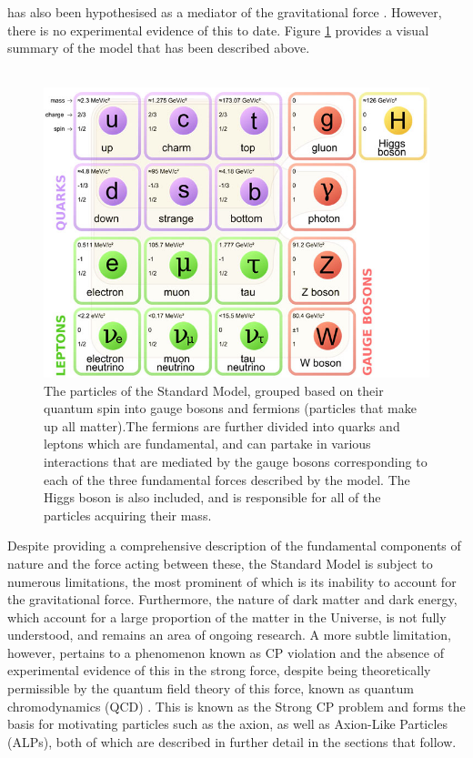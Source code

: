 has also been hypothesised as a mediator of the gravitational force \cite{Holstein:2006bh}. However, there is no experimental evidence of this to date. Figure \ref{StandardModel} provides a visual summary of the model that has been described above.\\
\\
\begin{figure}[H]
    \centering
    \includegraphics[scale = 0.4]{StandardModel.jpg}
    \caption{The particles of the Standard Model, grouped based on their quantum spin into gauge bosons and fermions (particles that make up all matter).The fermions are further divided into quarks and leptons which are fundamental, and can partake in various interactions that are mediated by the gauge bosons corresponding to each of the three fundamental forces described by the model. The Higgs boson is also included, and is responsible for all of the particles acquiring their mass.}
    \label{StandardModel}
\end{figure}
Despite providing a comprehensive description of the fundamental components of nature and the force acting between these, the Standard Model is subject to numerous limitations, the most prominent of which is its inability to account for the gravitational force. Furthermore, the nature of dark matter and dark energy, which account for
a large proportion of the matter in the Universe, is not fully understood, and remains an area of ongoing research. A more subtle limitation, however, pertains to a phenomenon known as CP violation and the absence of experimental evidence of this in the strong force, despite being theoretically permissible by the quantum field theory of this force,
known as quantum chromodynamics (QCD) \cite{Garcia_Irastorza_2022}. This is known as the Strong CP problem and forms the basis for motivating particles such as the axion, as well as Axion-Like Particles (ALPs), both of which are described in further detail in the sections that follow.
